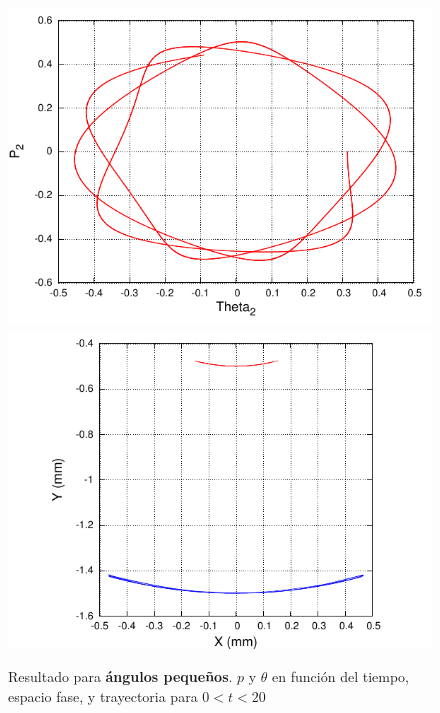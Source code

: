 \documentclass[10pt,letterpaper]{article}
\begin{document}
\begin{figure}
\includegraphics[scale=0.9]{SGrafica_EspacioFase.pdf}
\includegraphics[scale=0.9]{SGrafica_Trayectoria.pdf}
\caption{Resultado para \textbf{ángulos pequeños}. $p$ y $\theta$ en función del tiempo, espacio fase, y trayectoria para $0<t<20$}\label{Fig-AngulosPeque}
\end{figure}
\end{document}
